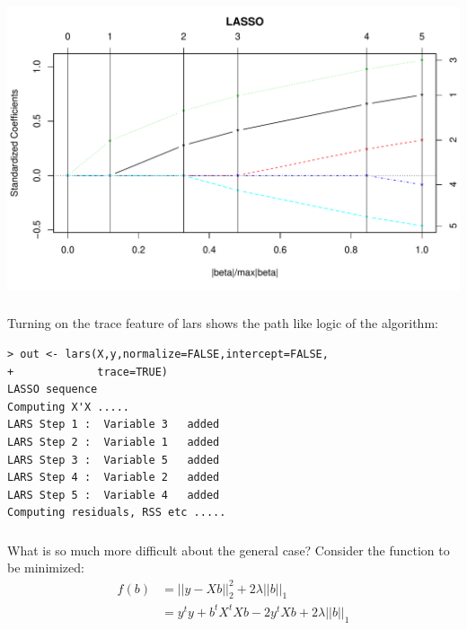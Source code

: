 \begin{frame}[fragile] \frametitle{}

\begin{center}
\includegraphics[width=\textwidth]{img/fig06.pdf}
\end{center}

\end{frame}

\begin{frame}[fragile] \frametitle{}

Turning on the trace feature of lars shows the
path like logic of the algorithm:
\begin{verbatim}
> out <- lars(X,y,normalize=FALSE,intercept=FALSE,
+             trace=TRUE)
LASSO sequence
Computing X'X .....
LARS Step 1 :  Variable 3   added
LARS Step 2 :  Variable 1   added
LARS Step 3 :  Variable 5   added
LARS Step 4 :  Variable 2   added
LARS Step 5 :  Variable 4   added
Computing residuals, RSS etc .....
\end{verbatim}

\end{frame}


\begin{frame}[fragile] \frametitle{}

What is so much more difficult about the general case?
Consider the function to be minimized:
\begin{align*}
f(b) &= || y - Xb ||_2^2 + 2 \lambda ||b||_1 \\
&= y^t y + b^t X^t X b - 2 y^t X b + 2 \lambda || b ||_1
\end{align*}


\end{frame}

